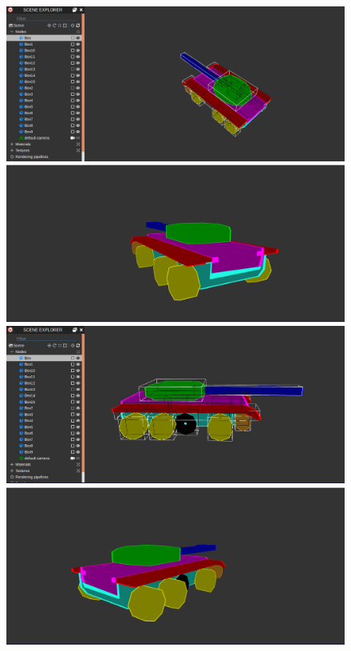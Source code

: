 \documentclass[14pt]{article}
\begin{document}
\begin{figure}[H]
\begin{minipage}[t]{0.45\textwidth}
\center
\includegraphics[width=\textwidth]{images/evidencedModel2.png}
\end{minipage}
\hfill
\begin{minipage}[t]{0.45\textwidth}
\center
\includegraphics[width=\textwidth]{images/evidencedModel9.png}
\end{minipage}
\begin{minipage}[t]{0.45\textwidth}
\center
\includegraphics[width=\textwidth]{images/evidencedModel4.png}
\end{minipage}
\hfill
\begin{minipage}[t]{0.45\textwidth}
\center
\includegraphics[width=\textwidth]{images/evidencedModel11.png}

\end{minipage}
\end{figure}
\end{document}
